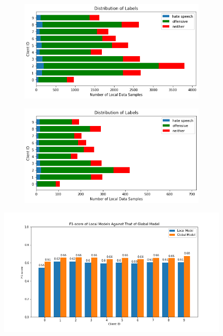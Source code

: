 \documentclass[letterpaper]{article} %
\begin{document}
\begin{figure}[hbt!]

\begin{subfigure}{\columnwidth}
{\includegraphics[width=\columnwidth]{iid-quantity-skew_distribution_of_labels_5}}
\caption{}
\end{subfigure}

\begin{subfigure}{\columnwidth}
{\includegraphics[width=\columnwidth]{iid-quantity-skew_test_set_distribution_of_labels_5}}
\caption{}
\end{subfigure}

\caption{}
\end{figure}

\begin{figure}[hbt!]
{\includegraphics[width=\columnwidth]{iid-quantity-skew_seed_5performance_of_models_on_client_data_f1score}}
\caption{}
\end{figure}
\end{document}

